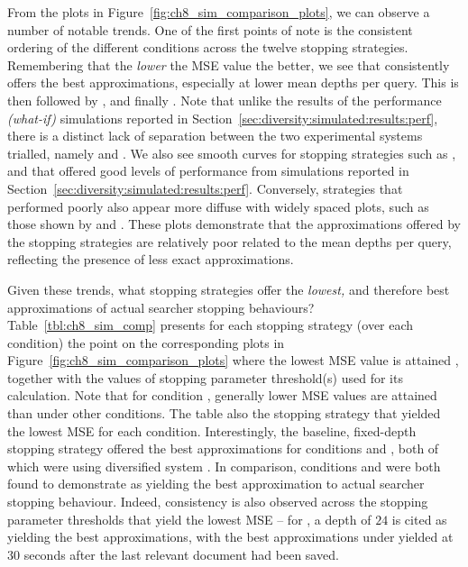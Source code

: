From the plots in Figure~\ref{fig:ch8_sim_comparison_plots}, we can observe a number of notable trends. One of the first points of note is the consistent ordering of the different conditions across the twelve stopping strategies. Remembering that the \emph{lower} the MSE value the better, we see that  consistently offers the best approximations, especially at lower mean depths per query. This is then followed by ,  and finally . Note that unlike the results of the performance \emph{(what-if)} simulations reported in Section~\ref{sec:diversity:simulated:results:perf}, there is a distinct lack of separation between the two experimental systems trialled, namely  and . We also see smooth curves for stopping strategies such as ,  and  that offered good levels of performance from simulations reported in Section~\ref{sec:diversity:simulated:results:perf}. Conversely, strategies that performed poorly also appear more diffuse with widely spaced plots, such as those shown by  and . These plots demonstrate that the approximations offered by the stopping strategies are relatively poor related to the mean depths per query, reflecting the presence of less exact approximations.

Given these trends, what stopping strategies offer the \emph{lowest,} and therefore best approximations of actual searcher stopping behaviours? Table~\ref{tbl:ch8_sim_comp} presents for each stopping strategy (over each condition) the point on the corresponding plots in Figure~\ref{fig:ch8_sim_comparison_plots} where the lowest MSE value is attained , together with the values of stopping parameter threshold(s)  used for its calculation. Note that for condition , generally lower MSE values are attained than under other conditions. The table also  the stopping strategy that yielded the lowest MSE for each condition. Interestingly, the baseline, fixed-depth stopping strategy  offered the best approximations for conditions  and , both of which were using diversified system . In comparison, conditions  and  were both found to demonstrate  as yielding the best approximation to actual searcher stopping behaviour. Indeed, consistency is also observed across the stopping parameter thresholds that yield the lowest MSE -- for , a depth of $24$ is cited as yielding the best approximations, with the best approximations under  yielded at $30$ seconds after the last relevant document had been saved.

